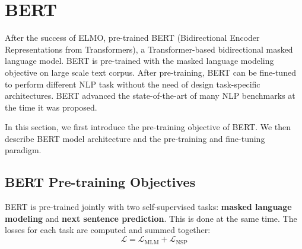 \newcommand{\paramspace}{{\color{MacroColor}\Theta}}
\newcommand{\modelparams}{{\color{MacroColor}\vtheta}}
\newcommand{\model}{{\color{MacroColor}\pM^\vtheta}}
\newcommand{\loglike}{{\color{MacroColor}\mathcal{L}}}
\newcommand{\vthetamle}{{\color{MacroColor}\modelparams{\mathrm{MLE}}}}
\newcommand{\corpus}{{\color{MacroColor}\mathcal{D}}}
\newcommand{\corpustrain}{{\color{MacroColor}\mathcal{D}_{\scaleto{\text{train}}{4pt}}}}
\newcommand{\corpustest}{{\color{MacroColor}\mathcal{D}_{\scaleto{\text{test}}{4pt}}}}
\newcommand{\corpusval}{{\color{MacroColor}\mathcal{D}_{\scaleto{\text{val}}{4pt}}}}
\newcommand{\calX}{{\color{MacroColor}\mathcal{X}}}
\newcommand{\ent}{{\color{MacroColor}\mathrm{H}}}
\newcommand{\objective}{{\color{MacroColor}O}}
\newcommand{\loss}{{\color{MacroColor}\ell}}
\newcommand{\datasize}{{\color{red}N}}
\newcommand{\dataidx}{{\color{red}n}}
\newcommand{\numtimesteps}{{\color{red}T}}
\newcommand{\timeidx}{{\color{red}t}}
\newcommand{\desiderata}{{\color{MacroColor}S}}
\newcommand{\learningrate}{{\color{MacroColor}\boldsymbol\eta}}
\newcommand{\updatedir}{{\color{MacroColor}U}}
\newcommand\bertbase{BERT$_{\textsc{BASE}}$\xspace}
\newcommand\bertlarge{BERT$_{\textsc{LARGE}}$\xspace}

\section{BERT}

After the success of ELMO, \citet{devlin-etal-2019-bert} pre-trained BERT (Bidirectional Encoder Representations from Transformers), a Transformer-based bidirectional masked language model. BERT is pre-trained with the masked language modeling objective on large scale text corpus. After pre-training, BERT can be fine-tuned to perform different NLP task without the need of design task-specific architectures. BERT advanced the state-of-the-art of many NLP benchmarks at the time it was proposed.

In this section, we first introduce the pre-training objective of BERT. We then describe BERT model architecture and the pre-training and fine-tuning paradigm.

\subsection*{BERT Pre-training Objectives}

BERT is pre-trained jointly with two self-supervised tasks: \textbf{masked language modeling} and \textbf{next sentence prediction}.
This is done at the same time.
The losses for each task are computed and summed together:
$$
\mathcal{L} = \mathcal{L}_\text{MLM}+\mathcal{L}_\text{NSP}
$$


